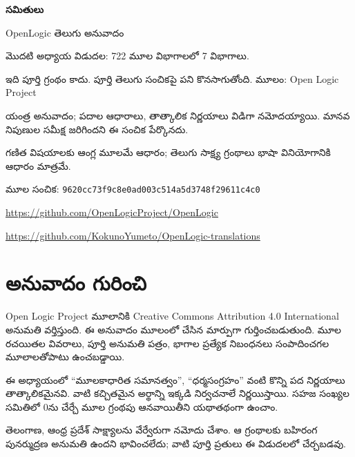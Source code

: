 \documentclass[11pt,a4paper,oneside]{book}
\theoremstyle{definition}
\begin{document}
\frontmatter
\begin{titlepage}
\vspace*{25mm}
{\Huge\bfseries సమితులు\par}
\vspace{10mm}
{\Large OpenLogic తెలుగు అనువాదం\par}
\vspace{8mm}
మొదటి అధ్యాయ విడుదల: 722 మూల విభాగాలలో 7 విభాగాలు.
\par ఇది పూర్తి గ్రంథం కాదు. పూర్తి తెలుగు సంచికపై పని కొనసాగుతోంది.
\vfill
మూలం: Open Logic Project\par
యంత్ర అనువాదం; పదాల ఆధారాలు, తాత్కాలిక నిర్ణయాలు విడిగా నమోదయ్యాయి.
మానవ నిపుణుల సమీక్ష జరిగిందని ఈ సంచిక పేర్కొనదు.
\par గణిత విషయాలకు ఆంగ్ల మూలమే ఆధారం; తెలుగు సాక్ష్య గ్రంథాలు
భాషా వినియోగానికి ఆధారం మాత్రమే.
\vspace{8mm}
{\small మూల సంచిక: \texttt{9620cc73f9c8e0ad003c514a5d3748f29611c4c0}\par
\url{https://github.com/OpenLogicProject/OpenLogic}\par
\url{https://github.com/KokunoYumeto/OpenLogic-translations}}
\end{titlepage}
\section*{అనువాదం గురించి}
Open Logic Project మూలానికి Creative Commons Attribution 4.0 International
అనుమతి వర్తిస్తుంది. ఈ అనువాదం మూలంలో చేసిన మార్పుగా గుర్తించబడుతుంది.
మూల రచయితల వివరాలు, పూర్తి అనుమతి పత్రం, భాగాల ప్రత్యేక నిబంధనలు
సంపాదించగల మూలాలతోపాటు ఉంచబడ్డాయి.
\par ఈ అధ్యాయంలో ``మూలకాధారిత సమానత్వం'', ``ధర్మసంగ్రహం'' వంటి కొన్ని
పద నిర్ణయాలు తాత్కాలికమైనవి. వాటి కచ్చితమైన అర్థాన్ని ఇక్కడి
నిర్వచనాలే నిర్ణయిస్తాయి. సహజ సంఖ్యల సమితిలో $0$ను చేర్చే మూల
గ్రంథపు ఆనవాయితీని యథాతథంగా ఉంచాం.
\par తెలంగాణ, ఆంధ్ర ప్రదేశ్ సాక్ష్యాలను వేర్వేరుగా నమోదు చేశాం.
ఆ గ్రంథాలకు బహిరంగ పునర్ముద్రణ అనుమతి ఉందని భావించలేదు; వాటి పూర్తి
ప్రతులు ఈ విడుదలలో చేర్చబడవు.
\tableofcontents
\mainmatter

\end{document}
